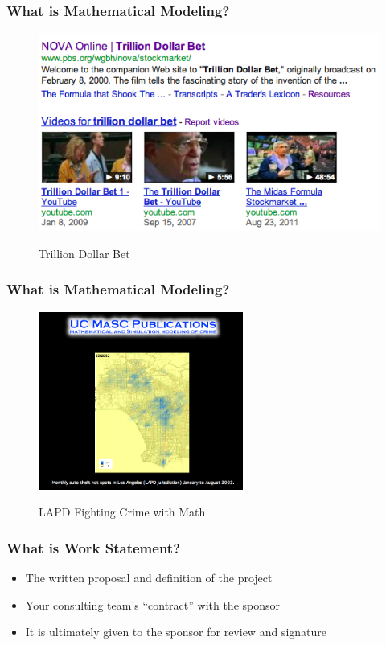 \documentclass[hyperref={colorlinks=false},compress,handout,10pt]{beamer}
\let\olditem\item
\renewcommand{\item}{\setlength{\itemsep}{0.5\baselineskip}\olditem}
\begin{document}
\begin{frame}
    \frametitle{What is Mathematical Modeling?}
    \begin{figure}
        \centering
        \href{http://www.youtube.com/watch?v=dsrOXJwGwtk}{
        \includegraphics[width=\textwidth]{TrillionDollarBet.png}
        }
        \caption{Trillion Dollar Bet}
                \label{fig:LTCM}
    \end{figure}
\end{frame}

\begin{frame}
    \frametitle{What is Mathematical Modeling?}
    \begin{figure}
        \centering
        \href{http://www.youtube.com/watch?v=HZ7fLuO7zb4}{\includegraphics[width=0.6\textwidth]{LAPDUCLA.png}}
        \caption{
        {LAPD Fighting Crime with Math}} \label{fig:LAPDUCLA}
    \end{figure}
\end{frame}

\begin{frame}
    \frametitle{What is Work Statement?}
    \begin{itemize}
        \item The written proposal and definition of the project
            \vspace{1cm}
        \item Your consulting team's ``contract'' with the sponsor
            \vspace{1cm}
        \item It is ultimately given to the sponsor for review and signature
    \end{itemize}
\end{frame}
\end{document}

